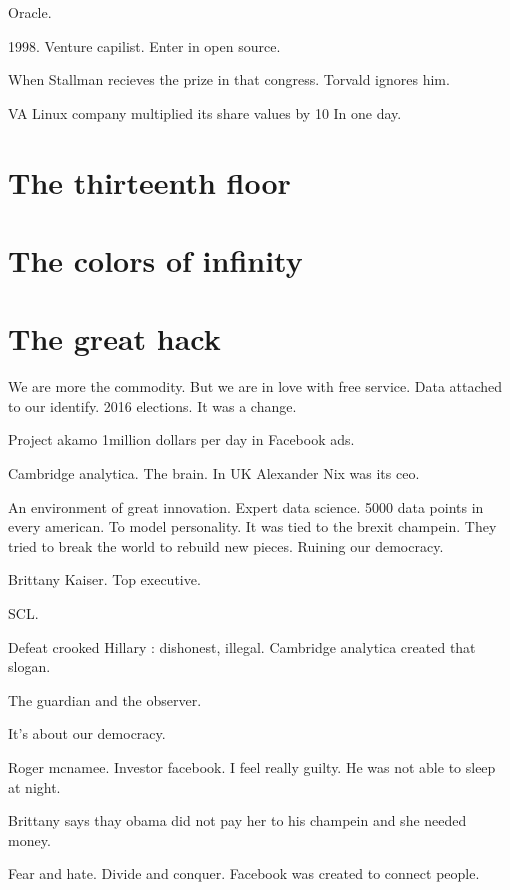   Oracle. 
  
  1998. Venture capilist. Enter in open source. 
  
  When Stallman recieves the prize in that congress. Torvald ignores him. 
  
  VA Linux company multiplied its share values by 10 In one day. 
  
 
 
 
    
  \section{The thirteenth floor} 
  
   \section{The colors of infinity} 
   
 
  
  \section{The great hack}
  
  We are more the commodity. But we are in love with free service. Data attached to our identify. 
  2016 elections. It was a change. 
  
  Project akamo 1million dollars per day in Facebook ads. 
  
  Cambridge analytica. The brain. In UK 
  Alexander Nix was its ceo. 
  
  An environment of great innovation. 
  Expert data science. 
  5000 data points in every american. To model personality. 
  It was tied to the brexit champein. 
  They tried to break the world to rebuild new pieces. 
  Ruining our democracy. 
  
  Brittany Kaiser. Top executive. 
  
  SCL. 
  
  Defeat crooked Hillary : dishonest, illegal. Cambridge analytica created that slogan. 
  
  
  The guardian and the observer. 
  
  It's about our democracy. 
  
  Roger mcnamee. Investor facebook. 
  I feel really guilty. He was not able to sleep at night. 
  
  Brittany says thay obama did not pay her to his champein and she needed money. 
  
  Fear and hate. Divide and conquer. Facebook was created to connect people. 
  
